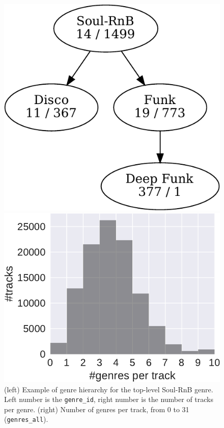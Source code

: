 \documentclass{article}
\begin{document}
\begin{figure}
	\begin{minipage}[t]{0.44\linewidth}
		\centering
		\includegraphics[width=\linewidth]{genre_hierarchy.pdf}
	\end{minipage} \hfill
	\begin{minipage}[t]{0.55\linewidth}
		\centering
		\includegraphics[width=\linewidth]{genres_per_track.pdf}
	\end{minipage}
	\caption{(left) Example of genre hierarchy for the top-level Soul-RnB genre. Left number is the \texttt{genre\_id}, right number is the number of tracks per genre. (right) Number of genres per track, from 0 to 31 (\texttt{genres\_all}).}
	\label{fig:genre_hierarchy}
	\label{fig:genres_per_track}
\end{figure}
\end{document}
